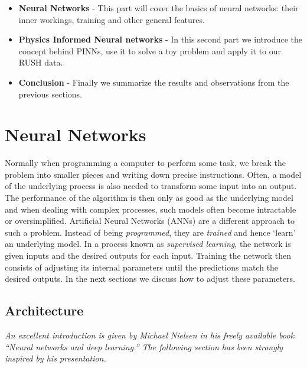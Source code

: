 \documentclass{Dissertate}
\providecommand{\tightlist}{%
  \setlength{\itemsep}{0pt}\setlength{\parskip}{0pt}}
\begin{document}
\begin{itemize}
\tightlist
\item
  \textbf{Neural Networks} - This part will cover the basics of neural
  networks: their inner workings, training and other general features.
\item
  \textbf{Physics Informed Neural networks} - In this second part we
  introduce the concept behind PINNs, use it to solve a toy problem and
  apply it to our RUSH data.
\item
  \textbf{Conclusion} - Finally we summarize the results and
  observations from the previous sections.
\end{itemize}

\hypertarget{neural-networks}{%
\section{Neural Networks}\label{neural-networks}}

Normally when programming a computer to perform some task, we break the
problem into smaller pieces and writing down precise instructions.
Often, a model of the underlying process is also needed to transform
some input into an output. The performance of the algorithm is then only
as good as the underlying model and when dealing with complex processes,
such models often become intractable or oversimplified. Artificial
Neural Networks (ANNs) are a different approach to such a problem.
Instead of being \emph{programmed}, they are \emph{trained} and hence
`learn' an underlying model. In a process known as \emph{supervised
learning}, the network is given inputs and the desired outputs for each
input. Training the network then consists of adjusting its internal
parameters until the predictions match the desired outputs. In the next
sections we discuss how to adjust these parameters.

\hypertarget{architecture}{%
\subsection{Architecture}\label{architecture}}

\emph{An excellent introduction is given by Michael Nielsen in his
freely available book ``Neural networks and deep learning.'' The
following section has been strongly inspired by his presentation.}
\end{document}
